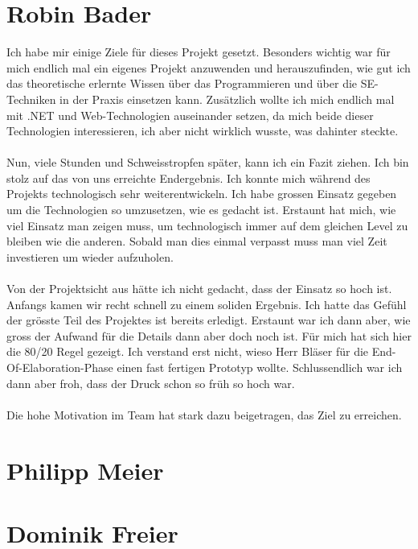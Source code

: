 	\section{Robin Bader}
	Ich habe mir einige Ziele für dieses Projekt gesetzt. Besonders wichtig war für mich endlich mal ein eigenes Projekt anzuwenden und herauszufinden, wie gut ich das theoretische erlernte Wissen über das Programmieren und über die SE-Techniken in der Praxis einsetzen kann. Zusätzlich wollte ich mich endlich mal mit .NET und Web-Technologien auseinander setzen, da mich beide dieser Technologien interessieren, ich aber nicht wirklich wusste, was dahinter steckte.\\ \\
Nun, viele Stunden und Schweisstropfen später, kann ich ein Fazit ziehen. Ich bin stolz auf das von uns erreichte Endergebnis. Ich konnte mich während des Projekts technologisch sehr weiterentwickeln. Ich habe grossen Einsatz gegeben um die Technologien so umzusetzen, wie es gedacht ist. Erstaunt hat mich, wie viel Einsatz man zeigen muss, um technologisch immer auf dem gleichen Level zu bleiben wie die anderen. Sobald man dies einmal verpasst muss man viel Zeit investieren um wieder aufzuholen.\\ \\
Von der Projektsicht aus hätte ich nicht gedacht, dass der Einsatz so hoch ist. Anfangs kamen wir recht schnell zu einem soliden Ergebnis. Ich hatte das Gefühl der grösste Teil des Projektes ist bereits erledigt. Erstaunt war ich dann aber, wie gross der Aufwand für die Details dann aber doch noch ist. Für mich hat sich hier die 80/20 Regel gezeigt. Ich verstand erst nicht, wieso Herr Bläser für die End-Of-Elaboration-Phase einen fast fertigen Prototyp wollte. Schlussendlich war ich dann aber froh, dass der Druck schon so früh so hoch war.\\ \\
Die hohe Motivation im Team hat stark dazu beigetragen, das Ziel zu erreichen.


	\section{Philipp Meier}
	
	
	\section{Dominik Freier}